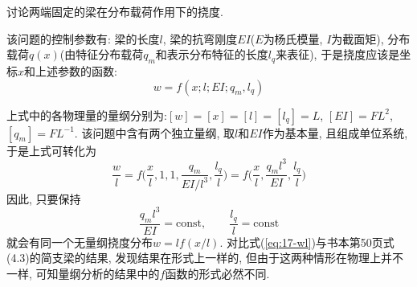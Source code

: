 \begin{problem}[17]
讨论两端固定的梁在分布载荷作用下的挠度.
\end{problem}
\begin{solution}
\begin{minipage}[c]{0.7\linewidth}
该问题的控制参数有: 梁的长度$l$, 梁的抗弯刚度$EI$($E$为杨氏模量, $I$为截面矩), 分布载荷$q(x)$(由特征分布载荷$q_m$和表示分布特征的长度$l_q$来表征), 于是挠度应该是坐标$x$和上述参数的函数:
\[
w = f(x; l; EI; q_m, l_q)
\]
\end{minipage}
\begin{minipage}[c]{0.3\linewidth}
\begin{center}

\end{center}
\end{minipage}\vspace{10pt}
上式中的各物理量的量纲分别为:$[w]=[x]=[l]=[l_q]=L$, $[EI]=FL^2$, $[q_m]=FL^{-1}$. 该问题中含有两个独立量纲, 取$l$和$EI$作为基本量, 且组成单位系统, 于是上式可转化为
\begin{equation}\label{eq:17-wl}
\frac{w}{l} = f\bigg(\frac{x}{l},1,1,\frac{q_m}{EI/l^3},\frac{l_q}{l}\bigg)
= f\bigg(\frac{x}{l},\frac{q_ml^3}{EI},\frac{l_q}{l}\bigg)
\end{equation}
因此, 只要保持
\[
\frac{q_ml^3}{EI}=\mathrm{const},\qquad \frac{l_q}{l}=\mathrm{const}
\]
就会有同一个无量纲挠度分布$w = lf(x/l)$. 对比式(\ref{eq:17-wl})与书本\cite{tan_dimensional_2011}第50页式(4.3)的简支梁的结果, 发现结果在形式上一样的, 但由于这两种情形在物理上并不一样, 可知量纲分析的结果中的$f$函数的形式必然不同.
\end{solution}
\label{problem:17}
